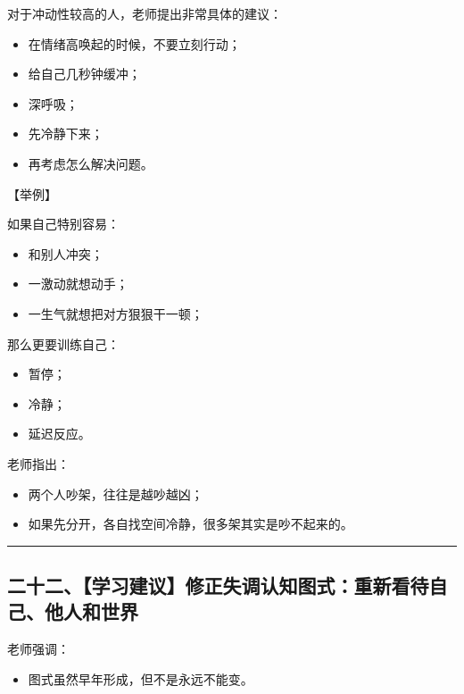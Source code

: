 \documentclass[
  chinese,
  9pt,
  a4paper,
]{ctexart}
\providecommand{\tightlist}{%
  \setlength{\itemsep}{0pt}\setlength{\parskip}{0pt}}
\begin{document}
对于冲动性较高的人，老师提出非常具体的建议：

\begin{itemize}
\tightlist
\item
  在情绪高唤起的时候，不要立刻行动；
\item
  给自己几秒钟缓冲；
\item
  深呼吸；
\item
  先冷静下来；
\item
  再考虑怎么解决问题。
\end{itemize}

【举例】

如果自己特别容易：

\begin{itemize}
\tightlist
\item
  和别人冲突；
\item
  一激动就想动手；
\item
  一生气就想把对方狠狠干一顿；
\end{itemize}

那么更要训练自己：

\begin{itemize}
\tightlist
\item
  暂停；
\item
  冷静；
\item
  延迟反应。
\end{itemize}

老师指出：

\begin{itemize}
\tightlist
\item
  两个人吵架，往往是越吵越凶；
\item
  如果先分开，各自找空间冷静，很多架其实是吵不起来的。
\end{itemize}

\begin{center}\rule{0.5\linewidth}{0.5pt}\end{center}

\subsection{二十二、【学习建议】修正失调认知图式：重新看待自己、他人和世界}\label{ux4e8cux5341ux4e8cux5b66ux4e60ux5efaux8baeux4feeux6b63ux5931ux8c03ux8ba4ux77e5ux56feux5f0fux91cdux65b0ux770bux5f85ux81eaux5df1ux4ed6ux4ebaux548cux4e16ux754c}

老师强调：

\begin{itemize}
\tightlist
\item
  图式虽然早年形成，但不是永远不能变。
\end{itemize}
\end{document}
